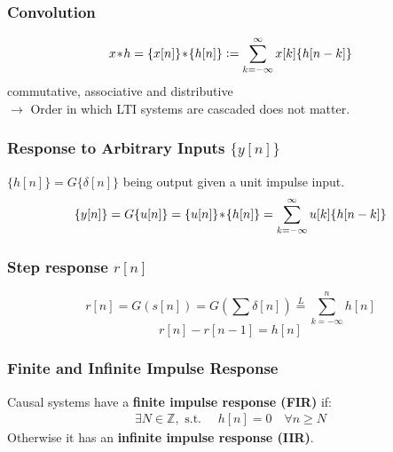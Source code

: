 \subsubsection{Convolution}
    \vspace{-1em}
    \begin{align*}
        x \!\ast\! h = \{x[n]\} \!\ast\! \{ h[n] \} \vcentcolon= \sum\limits_{k = -\infty}^\infty x[k] \{ h[n - k] \}
    \end{align*}
    commutative, associative and distributive\\ $\rightarrow$ Order in which LTI systems are cascaded does not matter.
\subsubsection{Response to Arbitrary Inputs \texorpdfstring{$\{y[n]\}$}{y[n]}}
    $\{ h[n] \} =  G\{\delta[n]\}$ being output given a unit impulse input.
    \begin{align*}
        \{y[n]\} = G\{u[n]\} = \{u[n]\}\!\ast\!\{h[n]\} = \sum\limits_{k=-\infty}^\infty u[k]\{ h[n-k]\}
    \end{align*}
\subsubsection{Step response \texorpdfstring{$r[n]$}{r[n]}}
    \vspace{-1em}
    $$
        r[n] = G(s[n]) = G\left(\sum \delta[n]\right) \overset{L}{=} \sum\limits_{k=-\infty}^n h[n]
    $$
    $$
        r[n] - r[n-1] = h[n]
    $$
\subsubsection{Finite and Infinite Impulse Response}
    Causal systems have a \textbf{finite impulse response (FIR)} if:
    \begin{align*}
        \exists N \in \mathbb{Z}, \textrm{ s.t. } \quad \boxed{h[n] = 0 \quad \forall n\geq N}
    \end{align*}
    Otherwise it has an \textbf{infinite impulse response (IIR)}.

